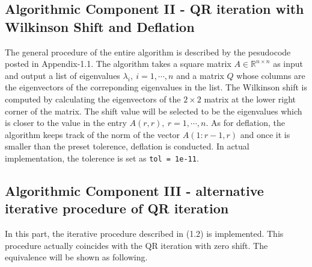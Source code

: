 \subsection{Algorithmic Component II - QR iteration with Wilkinson Shift and Deflation}
The general procedure of the entire algorithm is described by the pesudocode posted in Appendix-1.1. The algorithm takes a square matrix $A \in \mathbb{R}^{n \times n}$ as input and output a list of eigenvalues $\lambda_i, \ i = 1,\cdots, n$ and a matrix $Q$ whose columns are the eigenvectors of the correponding eigenvalues in the list. The Wilkinson shift is computed by calculating the eigenvectors of the $2 \times 2$ matrix at the lower right corner of the matrix. The shift value will be selected to be the eigenvalues which is closer to the value in the entry $A(r, r), \ r = 1, \cdots, n$. As for deflation, the algorithm keeps track of the norm of the vector $A(1 : r - 1, r)$ and once it is smaller than the preset tolerence, deflation is conducted. In actual implementation, the tolerence is set as \lstinline{tol = 1e-11}. 

\subsection{Algorithmic Component III - alternative iterative procedure of QR iteration}
In this part, the iterative procedure described in (1.2) is implemented. This procedure actually coincides with the QR iteration with zero shift. The equivalence will be shown as following. 

